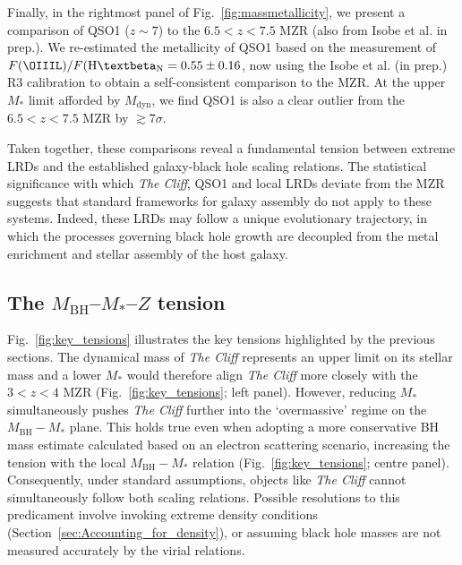 \documentclass[fleqn,usenatbib]{mnras}
\newcommand{\Hbeta}{\text{H\textbeta}\xspace}
\newcommand{\cliff}{\textit{The Cliff}\xspace}
\begin{document}
Finally, in the rightmost panel of Fig.~\ref{fig:massmetallicity}, we present a comparison of QSO1 ($z\sim7$) to the $6.5<z<7.5$ MZR (also from Isobe et al. in prep.).
We re-estimated the metallicity of QSO1 based on the \cite{Maiolino2025_QSO1} measurement of $F(\OIIIL)/F(\Hbeta_\mathrm{N} = 0.55\pm0.16$, now using the Isobe et al. (in prep.) R3 calibration to obtain a self-consistent comparison to the MZR.
At the upper $M_\ast$ limit afforded by $M_\mathrm{dyn}$, we find QSO1 is also a clear outlier from the $6.5<z<7.5$ MZR by $\gtrsim7\sigma$.

Taken together, these comparisons reveal a fundamental tension between extreme LRDs and the established galaxy-black hole scaling relations. The statistical significance with which \cliff, QSO1 and local LRDs deviate from the MZR suggests that standard frameworks for galaxy assembly do not apply to these systems. Indeed, these LRDs may follow a unique evolutionary trajectory, in which the processes governing black hole growth are decoupled from the metal enrichment and stellar assembly of the host galaxy.

\subsection{The \texorpdfstring{$M_\mathrm{BH}$}{MBH}--\texorpdfstring{$M_\ast$}{M*}--\texorpdfstring{$Z$}{Z} tension}

Fig.~\ref{fig:key_tensions} illustrates the key tensions highlighted by the previous sections. The dynamical mass of \cliff represents an upper limit on its stellar mass and a lower $M_\ast$ would therefore align \cliff more closely with the $3<z<4$ MZR (Fig.~\ref{fig:key_tensions}; left panel). However, reducing $M_\ast$ simultaneously pushes \cliff further into the `overmassive' regime on the $M_\mathrm{BH}-M_\ast$ plane. This holds true even when adopting a more conservative BH mass estimate calculated based on an electron scattering scenario, increasing the tension with the local $M_\mathrm{BH}-M_\ast$ relation (Fig.~\ref{fig:key_tensions}; centre panel). Consequently, under standard assumptions, objects like \cliff cannot simultaneously follow both scaling relations. Possible resolutions to this predicament involve invoking extreme density conditions (Section~\ref{sec:Accounting_for_density}), or assuming black hole masses are not measured accurately by the virial relations.
\end{document}
